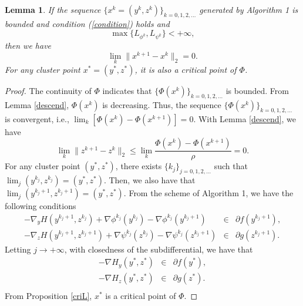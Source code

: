 \documentclass[12pt]{article}
\newtheorem{proof}{Proof}
\newtheorem{lemma}{Lemma}
\begin{document}
\begin{lemma}\label{limit}
If the sequence $\{x^k=(y^k,z^k)\}_{k=0,1,2,\ldots}$ generated by Algorithm 1 is bounded and condition (\ref{condition})  holds and
\begin{equation}\label{condition2}
   \max\{L_{\phi^k},L_{\psi^k}\}<+\infty,
\end{equation}
 then we have
\begin{equation}
    \lim_{k}\|x^{k+1}-x^k\|_2=0.
\end{equation}
For any cluster point $x^*=(y^*,z^*)$, it is also a critical point of $\Phi$.
\end{lemma}
\begin{proof}
 The continuity of $\Phi$ indicates that $\{\Phi(x^k)\}_{k=0,1,2,\ldots}$ is bounded. From Lemma \ref{descend},  $\Phi(x^k)$ is decreasing. Thus, the sequence $\{\Phi(x^k)\}_{k=0,1,2,\ldots}$ is convergent, i.e., $\lim_{k}[\Phi(x^k)-\Phi(x^{k+1})]=0$.  With Lemma \ref{descend}, we have
\begin{equation}
    \lim_{k}\|z^{k+1}-z^k\|_2\leq\lim_{k}\frac{\Phi(x^k)-\Phi(x^{k+1})}{\rho}=0.
\end{equation}
For any cluster point $(y^*,z^*)$, there exists $\{k_j\}_{j=0,1,2,\ldots}$ such that $\lim_{j}(y^{k_j},z^{k_j})=(y^*,z^*)$. Then, we also have that $\lim_{j}(y^{k_j+1},z^{k_j+1})=(y^*,z^*)$.
From the scheme of Algorithm 1, we have the following conditions
\begin{eqnarray}
-\nabla_{y}H(y^{k_j+1},z^{k_j})+\nabla\phi^{k_j}(y^{k_j})-\nabla\phi^{k_j}(y^{k_j+1})&\in& \partial f(y^{k_j+1}),\nonumber\\
-\nabla_{z}H(y^{k_j+1},z^{k_j+1})+\nabla\psi^{k_j}(z^{k_j})-\nabla\psi^{k_j}(z^{k_j+1})&\in& \partial g(z^{k_j+1}).\nonumber
\end{eqnarray}
Letting $j\rightarrow+\infty$, with closedness of the subdifferential, we have that
\begin{eqnarray}
 -\nabla H_{y}(y^*,z^*)&\in& \partial f(y^{*}),\nonumber\\
-\nabla H_{z}(y^*,z^*)&\in& \partial g(z^{*}).\nonumber\\
\end{eqnarray}
From Proposition \ref{criL}, $x^*$ is a critical point of $\Phi$.
\end{proof}
\end{document}
